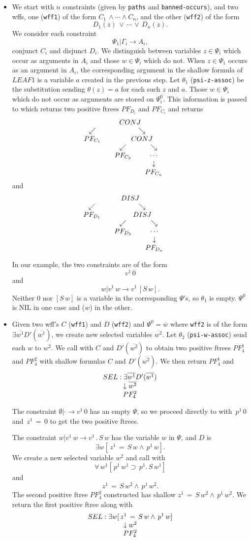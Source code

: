 \begin{enumerate}
\begin{itemize}
\item {\bf {}}
We start with $n$ constraints (given by \verb+paths+ and \verb+banned-occurs+),
and two wffs, one (\verb+wff1+) of the form
$C_1\,\land \cdots \land C_n$,
and the other (\verb+wff2+) of the form
$$D_1(\overline{z})\,\lor\,\cdots\,\lor\, D_n(\overline{z}).$$
We consider each constraint
$$\Psi_1|\Gamma_i\rightarrow A_i,$$
conjunct $C_i$ and disjunct $D_i$.
We distinguish between variables $z\in\Psi_i$ which
occur as arguments in $A_i$ and those $w\in\Psi_i$ which do not.
When $z\in\Psi_1$ occurs as an argument in $A_i$,
the corresponding argument in the shallow formula of $LEAF1$
is a variable $a$ created in the previous step.
Let $\theta_1$ (\verb+psi-z-assoc+) be the substitution sending $\theta(z)=a$
for each such $z$ and $a$.
Those $w\in\Psi_i$ which do not occur as
arguments are stored on $\Psi^0_i$.  This information is passed
to 
which returns two positive ftrees $PF_{D_i}$ and
$PF_{C_i}$ and returns
$${{\begin{array}[t]{c}CONJ \\ \begin{array}[t]{cc} \swarrow & \searrow \\ PF_{C_1} & {{\begin{array}[t]{c}CONJ \\ \begin{array}[t]{cc} \swarrow & \searrow \\ PF_{C_2} & {\begin{array}[t]{c}\cdots \\ \begin{array}[t]{c} \downarrow \\ PF_{C_n}\end{array}\end{array}} \end{array}\end{array}}} \end{array}\end{array}}}$$
and
$${{\begin{array}[t]{c}DISJ \\ \begin{array}[t]{cc} \swarrow & \searrow \\ PF_{D_1} & {{\begin{array}[t]{c}DISJ \\ \begin{array}[t]{cc} \swarrow & \searrow \\ PF_{D_2} & {\begin{array}[t]{c}\cdots \\ \begin{array}[t]{c} \downarrow \\ PF_{D_n}\end{array}\end{array}} \end{array}\end{array}}} \end{array}\end{array}}}$$

In our example, the two constraints are of the form
$$v^1\, 0$$
and
$$w|v^1\, w\rightarrow v^1\, [S\, w].$$
Neither $0$ nor $[S\, w]$ is a variable in the corresponding $\Psi$'s,
so $\theta_1$ is empty.  $\Psi^0$ is NIL in one case
and ($w$) in the other.

\item {\bf {}}
Given two wff's $C$ (\verb+wff1+) and $D$ (\verb+wff2+) and $\Psi^0 = \overline{w}$
where \verb+wff2+ is of the form
$\exists \overline{w^1} D'(\overline{w^1})$, we create new selected variables
$\overline{w^2}$.  Let $\theta_2$ (\verb+psi-w-assoc+) send each $w$ to $w^2$.
We call 
with $C$ and $D'(\overline{w^2})$ to obtain
two positive ftrees $PF_4^1$ and $PF_4^2$ with shallow formulas
$C$ and $D'(\overline{w^2})$.  We then return $PF_4^1$ and 
$${{\begin{array}[t]{c}SEL: \exists \overline{w^1} D'(\overline{w^1}) \\ \begin{array}[t]{c} \downarrow \overline{w^2} \\ PF_4^2\end{array}\end{array}}}$$

The constraint $\emptyset |\cdot\rightarrow v^1\, 0$ has an empty $\Psi$,
so we proceed directly to 
with
$\,p^1 \,0$
and
$\,z^1 \,= \,0$ to get the two positive ftrees.

The constraint $w |v^1\, w\rightarrow v^1\, . \, S\, w$ has the variable $w$
in $\Psi$, and $D$ is
$$\exists w [ \,z^1 \,= \,S \,w \land \,p^1 \,w].$$
We create a new selected variable $w^2$ and call 
with
$$\forall \,w^1 [ \,p^1 \,w^1 \supset \,p^1 . \,S \,w^1 ]$$
and 
$$z^1 \,= \,S \,w^2 \land \,p^1 \,w^2.$$
The second positive ftree $PF_4^2$ constructed has
shallow $z^1 \,= \,S \,w^2 \land \,p^1 \,w^2$.  We return the
first positive ftree along with
$${{\begin{array}[t]{c}SEL: \exists w [ \,z^1 \,= \,S \,w \land \,p^1 \,w] \\ \begin{array}[t]{c} \downarrow w^2 \\ PF_4^2\end{array}\end{array}}}$$


\end{itemize}
\end{enumerate}
